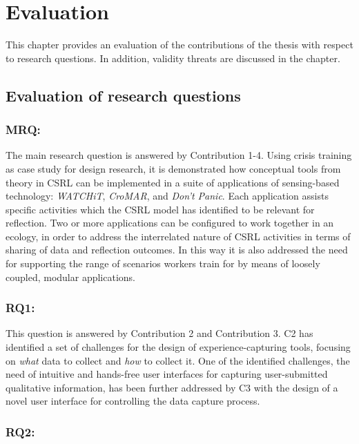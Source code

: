 \chapter{Evaluation}\label{evaluation}

This chapter provides an evaluation of the contributions of the thesis with respect to research questions. In addition, validity threats are discussed in the chapter.

\section{Evaluation of research questions}\label{evaluation-of-research-questions}

\subsection{MRQ: \MRQ}\label{mrq}

The main research question is answered by Contribution 1-4. Using crisis training as case study for design research, it is demonstrated how conceptual tools from theory in CSRL can be implemented in a suite of applications of sensing-based technology: \emph{WATCHiT}, \emph{CroMAR}, and \emph{Don't Panic}. Each application assists specific activities which the CSRL model has identified to be relevant for reflection. Two or more applications can be configured to work together in an ecology, in order to address the interrelated nature of CSRL activities in terms of sharing of data and reflection outcomes. In this way it is also addressed the need for supporting the range of scenarios workers train for by means of loosely coupled, modular applications.

\subsection{RQ1: \RQi}\label{rq1}

This question is answered by Contribution 2 and Contribution 3. C2 has identified a set of challenges for the design of experience-capturing tools, focusing on \emph{what} data to collect and \emph{how} to collect it. One of the identified challenges, the need of intuitive and hands-free user interfaces for capturing user-submitted qualitative information, has been further addressed by C3 with the design of a novel user interface for controlling the data capture process.

\subsection{RQ2: \RQii}\label{rq2}

